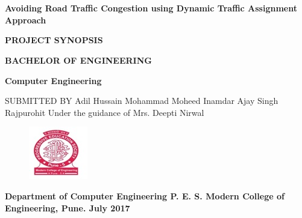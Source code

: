 \documentclass[12pt,a4paper,final]{article}
\begin{document}
\section*{}
\begin{center}
\Huge
\textbf{
Avoiding Road Traffic Congestion using Dynamic Traffic Assignment Approach
}

\vspace*{1.5cm}

\large
\textbf{
PROJECT SYNOPSIS
}

\vspace*{1.5cm}
\textbf{
BACHELOR OF ENGINEERING
}

\Large
\textbf{
Computer Engineering
}

\vspace*{1cm}
\large
SUBMITTED BY
\vspace*{1cm}
\linebreak
Adil Hussain
\linebreak
Mohammad Moheed Inamdar
\linebreak
Ajay Singh Rajpurohit
\linebreak
\linebreak
Under the guidance of
\linebreak
Mrs. Deepti Nirwal


\begin{figure}[h]
\begin{center}
\includegraphics[scale=1.0]{logo.png}
\end{center}
\end{figure}

\Large
\textbf{
Department of Computer Engineering
\linebreak
P. E. S. Modern College of Engineering,
\linebreak
Pune.
\linebreak
\linebreak
July 2017
}
\end{center}
\newpage

\tableofcontents
\listoffigures

\end{document}

